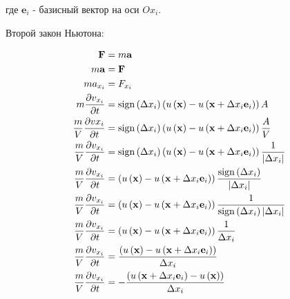 где \( \mathbf{e}_i \) - базисный вектор на оси \( Ox_i \).

Второй закон Ньютона:

\begin{align*}
    \mathbf{F} &= m \mathbf{a} \\
    m \mathbf{a} &= \mathbf{F} \\
    m a_{x_i} &= F_{x_i} \\
    m \frac{\partial v_{x_i}}{\partial t}
    &=
    \operatorname{sign} \left( \Delta x_i \right)
    \left(
    u \left( \mathbf{x} \right)
    - u \left( \mathbf{x} + \Delta x_i \mathbf{e}_i \right)
    \right)
    A
    \\
    \frac{m}{V} \frac{\partial v{x_i}}{\partial t}
    &=
    \operatorname{sign} \left( \Delta x_i \right)
    \left(
    u \left( \mathbf{x} \right)
    - u \left( \mathbf{x} + \Delta x_i \mathbf{e}_i \right)
    \right)
    \frac{A}{V}
    \\
    \frac{m}{V} \frac{\partial v_{x_i}}{\partial t}
    &=
    \operatorname{sign} \left( \Delta x_i \right)
    \left(
    u \left( \mathbf{x} \right)
    - u \left( \mathbf{x} + \Delta x_i \mathbf{e}_i \right)
    \right)
    \frac{1}{\lvert\Delta x_i\rvert}
    \\
    \frac{m}{V} \frac{\partial v_{x_i}}{\partial t}
    &=
    \left(
    u \left( \mathbf{x} \right)
    - u \left( \mathbf{x} + \Delta x_i \mathbf{e}_i \right)
    \right)
    \frac{\operatorname{sign} \left( \Delta x_i \right)}{\lvert\Delta x_i\rvert}
    \\
    \frac{m}{V} \frac{\partial v_{x_i}}{\partial t}
    &=
    \left(
    u \left( \mathbf{x} \right)
    - u \left( \mathbf{x} + \Delta x_i \mathbf{e}_i \right)
    \right)
    \frac{1}{\operatorname{sign} \left( \Delta x_i \right) \lvert\Delta x_i\rvert}
    \\
    \frac{m}{V} \frac{\partial v_{x_i}}{\partial t}
    &=
    \left(
    u \left( \mathbf{x} \right)
    - u \left( \mathbf{x} + \Delta x_i \mathbf{e}_i \right)
    \right)
    \frac{1}{\Delta x_i}
    \\
    \frac{m}{V} \frac{\partial v_{x_i}}{\partial t}
    &=
    \frac{
    \left(
    u \left( \mathbf{x} \right)
    - u \left( \mathbf{x} + \Delta x_i \mathbf{e}_i \right)
    \right)
    }
    {\Delta x_i}
    \\
    \frac{m}{V} \frac{\partial v_{x_i}}{\partial t}
    &=
    -
    \frac{
    \left(
    u \left( \mathbf{x} + \Delta x_i \mathbf{e}_i \right)
    - u \left( \mathbf{x} \right)
    \right)
    }
    {\Delta x_i}
\end{align*}

